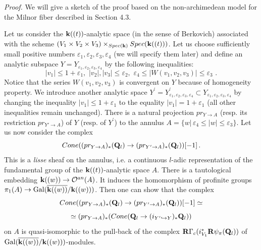 \documentclass[12pt]{article}
\begin{document}
{\it Proof.} We will give a sketch of the proof based on the non-archimedean model for the Milnor fiber described in Section 4.3. 

Let us consider the ${\bf k}((t))$-analytic space (in the sense of Berkovich) associated with
the scheme $(V_1\times V_2\times V_3)\times_{Spec({\bf k})}Spec({\bf k}((t)))$. Let us choose sufficiently small positive numbers $\varepsilon_1, \varepsilon_2,\varepsilon_3,\varepsilon_4 $ (we will specify them later) and define an analytic subspace $Y=Y_{\varepsilon_1, \varepsilon_2,\varepsilon_3,\varepsilon_4}$ by the following inequalities: 
$$|v_1|\le 1+\varepsilon_1, \,\,|v_2|,|v_3|\le \varepsilon_2, \,\,\varepsilon_4\le |W(v_1,v_2,v_3)|\le \varepsilon_3\,\,.$$
Notice that the series $W(v_1,v_2,v_3)$ is convergent on $Y$ because of homogeneity property.
We introduce  another analytic space
$Y^{\prime}=Y_{\varepsilon_1, \varepsilon_2,\varepsilon_3,\varepsilon_4 }^{\prime}\subset Y_{\varepsilon_1, \varepsilon_2,\varepsilon_3,\varepsilon_4 } $ by changing the inequality $|v_1|\le 1+\varepsilon_1$ to the equality
$|v_1|=1+\varepsilon_1$ (all other inequalities remain unchanged). There is a natural projection $pr_{Y\to A}$ (resp. its restriction $pr_{Y'\to A}$) of $Y$
(resp. of $Y^{\prime}$) to the annulus
$A=\{w|\,\varepsilon_4\le |w|\le \varepsilon_3\}$. Let us now consider the complex
$$Cone((pr_{Y\to A})_\ast({\bf Q}_l)\to  (pr_{Y'\to A})_\ast({\bf Q}_l))[-1]\,.$$ 
This is a {\it lisse} sheaf on the annulus, i.e. a continuous $l$-adic representation of the fundamental group of the ${\bf k}((t))$-analytic space $A$. There is a tautological embedding ${\bf k}((w))\to {\cal O}^{an}(A)$. It induces the homomorphism of profinite groups $\pi_1(A)\to
\operatorname{Gal}(\overline{{\bf k}((w))}/{\bf k}((w)))$. Then one can show that the complex 
$$Cone((pr_{Y\to A})_\ast({\bf Q}_l)\to  (pr_{Y'\to A})_\ast({\bf Q}_l))[-1]\simeq$$
$$\simeq (pr_{Y\to A})_\ast(Cone({\bf Q}_l\to (i_{Y'\hookrightarrow Y})_*{\bf Q}_l))$$  on $A$ is quasi-isomorphic to the pull-back of the complex ${\bf R}\Gamma_c(i^{\ast}_{V_1}{\bf R}\psi_{\pi}({\bf Q}_l))$ of $\operatorname{Gal}(\overline{{\bf k}((w))}/{\bf k}((w)))$-modules. 
\end{document}
